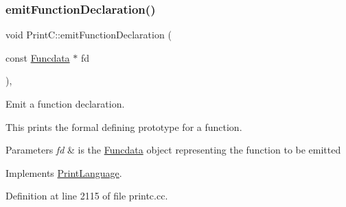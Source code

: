 \subsubsection{\texorpdfstring{emitFunctionDeclaration()}{emitFunctionDeclaration()}}
{\footnotesize\ttfamily void Print\+C\+::emit\+Function\+Declaration (\begin{DoxyParamCaption}\item[{const \mbox{\hyperlink{class_funcdata}{Funcdata}} $\ast$}]{fd }\end{DoxyParamCaption})\hspace{0.3cm}{\ttfamily [protected]}, {\ttfamily [virtual]}}



Emit a function declaration. 

This prints the formal defining prototype for a function. 
\begin{DoxyParams}{Parameters}
{\em fd} & is the \mbox{\hyperlink{class_funcdata}{Funcdata}} object representing the function to be emitted \\
\hline
\end{DoxyParams}


Implements \mbox{\hyperlink{class_print_language_a591f782041b30d6d0caf65dcbdd88c78}{Print\+Language}}.



Definition at line 2115 of file printc.\+cc.

